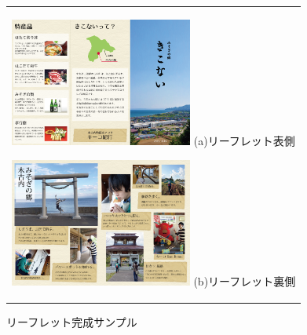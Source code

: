 \begin{figure}[htbp]
  \begin{center}
    \begin{tabular}{c}
      \begin{minipage}{0.33\hsize}
        \begin{center}
\includegraphics[width=6cm, bb=0 0 640 1104]{leaflet_front.png}
	\hspace{1cm} (a)リーフレット表側
        \end{center}
      \end{minipage}

      \begin{minipage}{0.33\hsize}
        \begin{center}
\includegraphics[width=6cm, bb=0 0 642 1094]{leaflet_back.png}
      	\hspace{1cm} (b)リーフレット裏側
	\end{center}
      \end{minipage}

    \end{tabular}
  \end{center}
\addtocounter{figure}{+0}
 \caption{リーフレット完成サンプル}
\end{figure}

